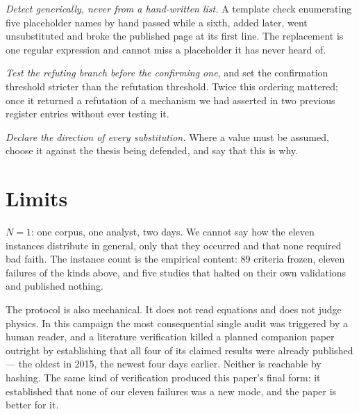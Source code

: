 \documentclass[11pt,a4paper]{article}
\begin{document}
\emph{Detect generically, never from a hand-written list.} A template check enumerating five
placeholder names by hand passed while a sixth, added later, went unsubstituted and broke the
published page at its first line. The replacement is one regular expression and cannot miss a
placeholder it has never heard of.

\emph{Test the refuting branch before the confirming one}, and set the confirmation threshold
stricter than the refutation threshold. Twice this ordering mattered; once it returned a
refutation of a mechanism we had asserted in two previous register entries without ever
testing it.

\emph{Declare the direction of every substitution.} Where a value must be assumed, choose it
against the thesis being defended, and say that this is why.

\section{Limits}

$N=1$: one corpus, one analyst, two days. We cannot say how the eleven instances distribute in
general, only that they occurred and that none required bad faith. The instance count is the
empirical content: 89 criteria frozen, eleven failures of the kinds above, and five studies
that halted on their own validations and published nothing.

The protocol is also mechanical. It does not read equations and does not judge physics. In
this campaign the most consequential single audit was triggered by a human reader, and a
literature verification killed a planned companion paper outright by establishing that all
four of its claimed results were already published --- the oldest in 2015, the newest four
days earlier. Neither is reachable by hashing. The same kind of verification produced this
paper's final form: it established that none of our eleven failures was a new mode, and the
paper is better for it.
\end{document}
